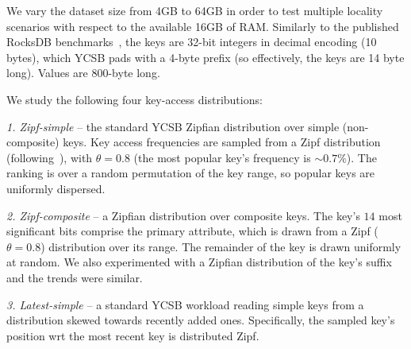 We vary the dataset size from 4GB to 64GB in order to test multiple locality 
scenarios with respect to the available 16GB of RAM. Similarly to the published RocksDB benchmarks~\cite{RocksDBPerf}, 
the keys are 32-bit integers in decimal encoding (10 bytes), which YCSB pads with a 4-byte prefix (so effectively, 
the keys are 14 byte long). Values are 800-byte long. 

\noindent
We study the following four key-access distributions:  

\emph{1. Zipf-simple} -- the standard YCSB Zipfian distribution over simple (non-composite) keys. 
Key access frequencies are sampled from a Zipf distribution 
(following~\cite{Gray:1994:QGB:191839.191886}), with $\theta = 0.8$
(the most popular key's frequency is  $\sim 0.7\%$). 
The ranking is over a random permutation of the key range, so popular keys are uniformly dispersed. %

\emph{2. Zipf-composite} -- a Zipfian distribution over composite keys.
The key's $14$ most significant bits comprise the primary attribute, which  
is drawn from a Zipf ($\theta=0.8$) distribution over its range. The remainder of the key is drawn uniformly at random.
We also experimented with a Zipfian distribution of the key's suffix and 
the trends were similar. %

\emph{3. Latest-simple} -- a standard YCSB workload reading simple keys from a distribution skewed towards recently added ones. 
Specifically, the sampled key's position wrt the most recent key is distributed Zipf. 

